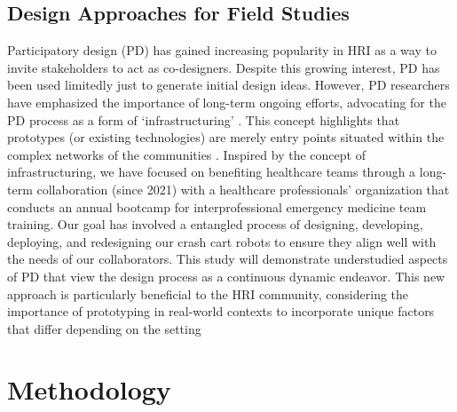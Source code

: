 \subsection{Design Approaches for Field Studies}

Participatory design (PD) has gained increasing popularity in HRI as a way to invite stakeholders to act as co-designers.%
 Despite this growing interest, PD has been used limitedly just to generate initial design ideas. 
However, PD researchers have emphasized the importance of long-term ongoing efforts, advocating for the PD process as a form of `infrastructuring' \cite{bjorgvinsson2010participatory}. 
This concept highlights that prototypes (or existing technologies) are merely entry points situated within the complex networks of the communities \cite{suchman2002located, star1994steps}. %
Inspired by the concept of infrastructuring, we have focused on benefiting healthcare teams through a long-term collaboration (since 2021) with a healthcare professionals’ organization that conducts an annual bootcamp for interprofessional emergency medicine team training. 
Our goal has involved a entangled process of designing, developing, deploying, and redesigning our crash cart robots to ensure they align well with the needs of our collaborators. This study will demonstrate understudied aspects of PD that view the design process as a continuous dynamic endeavor. 
This new approach is particularly beneficial to the HRI community, considering the importance of prototyping in real-world contexts to incorporate unique factors that differ depending on the setting \cite{lee2010gracefully} %



%
\section{Methodology}
          
